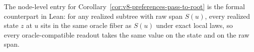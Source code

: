The node-level entry for
Corollary~\ref{cor:v8-preferences-pass-to-root} is the formal
counterpart in Lean: for any realized subtree with raw span
\(S(u)\), every realized state \(z\) at \(u\) sits in the same
oracle fiber as \(S(u)\) under exact local laws, so every
oracle-compatible readout takes the same value on the state and on
the raw span.
